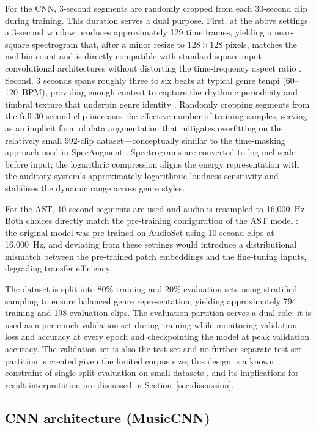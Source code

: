 \documentclass{article}
\begin{document}
For the CNN, 3-second segments are randomly cropped from each 30-second clip during training. This duration serves a dual purpose. First, at the above settings a 3-second window produces approximately 129 time frames, yielding a near-square spectrogram that, after a minor resize to $128 \times 128$ pixels, matches the mel-bin count and is directly compatible with standard square-input convolutional architectures without distorting the time-frequency aspect ratio \cite{Dieleman2014}. Second, 3 seconds spans roughly three to six beats at typical genre tempi (60--120~BPM), providing enough context to capture the rhythmic periodicity and timbral texture that underpin genre identity \cite{Tzanetakis2002}. Randomly cropping segments from the full 30-second clip increases the effective number of training samples, serving as an implicit form of data augmentation that mitigates overfitting on the relatively small 992-clip dataset—conceptually similar to the time-masking approach used in SpecAugment \cite{Park2019}. Spectrograms are converted to log-mel scale before input; the logarithric compression aligns the energy representation with the auditory system's approximately logarithmic loudness sensitivity and stabilises the dynamic range across genre styles.

For the AST, 10-second segments are used and audio is resampled to 16,000~Hz. Both choices directly match the pre-training configuration of the AST model \cite{Gong2021}: the original model was pre-trained on AudioSet using 10-second clips at 16,000~Hz, and deviating from these settings would introduce a distributional mismatch between the pre-trained patch embeddings and the fine-tuning inputs, degrading transfer efficiency.

The dataset is split into 80\% training and 20\% evaluation sets using stratified sampling to ensure balanced genre representation, yielding approximately 794 training and 198 evaluation clips. The evaluation partition serves a dual role: it is used as a per-epoch validation set during training while monitoring validation loss and accuracy at every epoch and checkpointing the model at peak validation accuracy. The validation set is also the test set and no further separate test set partition is created given the limited corpus size; this design is a known constraint of single-split evaluation on small datasets \cite{Flexer2007}, and its implications for result interpretation are discussed in Section~\ref{sec:discussion}.

\subsection{CNN architecture (MusicCNN)}\label{subsec:cnn}
\end{document}
